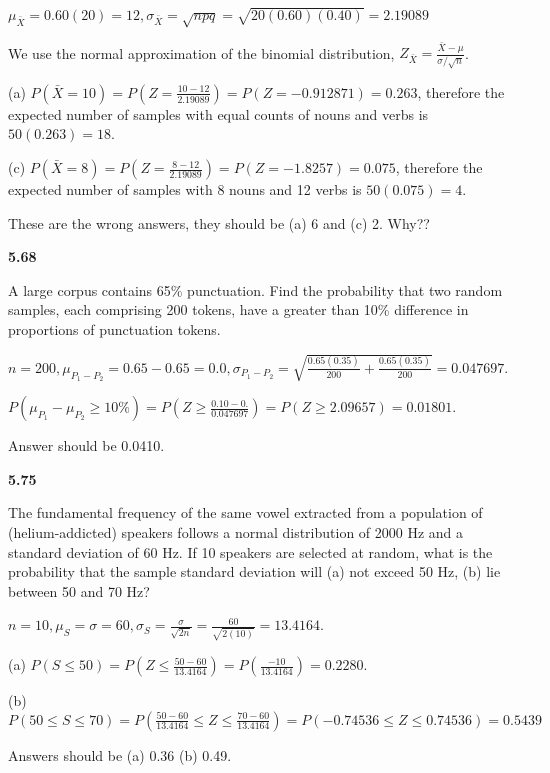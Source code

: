 \documentclass[11pt,letterpaper]{scrartcl}
\begin{document}

$\mu_{\bar{X}} = 0.60(20)=12, \sigma_{\bar{X}} = \sqrt{npq} = \sqrt{20(0.60)(0.40)} = 2.19089$

We use the normal approximation of the binomial distribution, $Z_{\bar{X}} = \frac{\bar{X} - \mu}{\sigma / \sqrt{n}}$.

(a) $P(\bar{X} = 10) = P(Z = \frac{10 - 12}{2.19089}) = P(Z = -0.912871) = 0.263$, therefore the expected number of samples with equal counts of nouns and verbs is $50(0.263)=18$.

(c) $P(\bar{X} = 8) = P(Z = \frac{8 -12}{2.19089}) = P(Z = -1.8257) = 0.075$, therefore the expected number of samples with 8 nouns and 12 verbs is $50(0.075) = 4$.

{\color{red} These are the wrong answers, they should be (a) 6 and (c) 2. Why??}

\textbf{5.68}

A large corpus contains 65\% punctuation. Find the probability that two random samples, each comprising 200 tokens, have a greater than 10\% difference in proportions of punctuation tokens.

$n=200, \mu_{P_{1} - P_{2}} = 0.65 - 0.65 = 0.0, \sigma_{P_{1} - P_{2}} = \sqrt{\frac{0.65(0.35)}{200} + \frac{0.65(0.35)}{200}} = 0.047697$.

$P(\mu_{P_{1}} - \mu_{P_{2}} \geq 10\%) = P(Z \geq \frac{0.10 - 0.}{0.047697}) = P(Z \geq 2.09657) = 0.01801$.

{\color{red} Answer should be 0.0410.}

\textbf{5.75}

The fundamental frequency of the same vowel extracted from a population of (helium-addicted) speakers follows a normal distribution of 2000 Hz and a standard deviation of 60 Hz. 
If 10 speakers are selected at random, what is the probability that the sample standard deviation will (a) not exceed 50 Hz, (b) lie between 50 and 70 Hz?

$n=10, \mu_{S} = \sigma = 60, \sigma_{S} = \frac{\sigma}{\sqrt{2n}} = \frac{60}{\sqrt{2(10)}} = 13.4164$.

(a) $P(S \leq 50) = P(Z \leq \frac{50 - 60}{13.4164}) = P(\frac{-10}{13.4164}) = 0.2280$.

(b) $P(50 \leq S \leq 70) = P(\frac{50 - 60}{13.4164} \leq Z \leq \frac{70 - 60}{13.4164}) = P(-0.74536 \leq Z \leq 0.74536) = 0.5439$

{\color{red} Answers should be (a) 0.36 (b) 0.49.}
\end{document}
